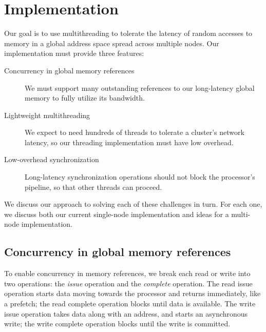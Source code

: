 \documentclass[10pt,nocopyrightspace]{sigplanconf}
\begin{document}
\section{Implementation}
\label{sec:approach}
Our goal is to use multithreading to tolerate
the latency of random accesses to memory in a global address space
spread across multiple nodes.  Our implementation must provide three features:
\begin{description}
\item[Concurrency in global memory references\quad] We must support many
  outstanding references to our long-latency global memory to fully
  utilize its bandwidth.

\item[Lightweight multithreading\quad] We expect to need hundreds of
  threads to tolerate a cluster's network latency, so our threading
  implementation must have low overhead.

\item[Low-overhead synchronization\quad] 
Long-latency synchronization operations should not block the processor's
pipeline, so that other threads can proceed.
  
\end{description}
We discuss our approach to solving each of these challenges in
turn. For each one, we discuss both our current single-node
implementation and ideas for a multi-node implementation.


\subsection{Concurrency in global memory references}

To enable concurrency in memory references, we break each read or
write into two operations: the {\em issue} operation and the {\em
  complete} operation. The read issue operation starts data moving
towards the processor and returns immediately, like a prefetch; the
read complete operation blocks until data is available. The write
issue operation takes data along with an address, and starts an
asynchronous write; the write complete operation blocks until the
write is committed.
\end{document}

